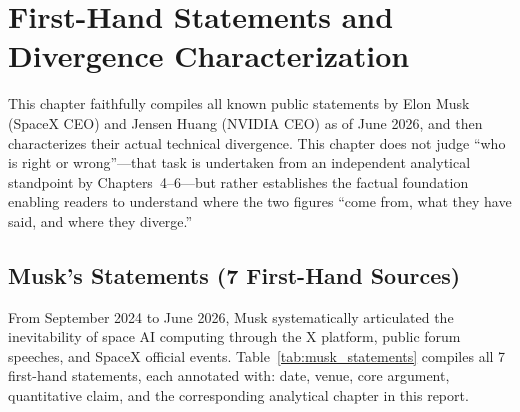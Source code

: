 
\section{First-Hand Statements and Divergence Characterization}

This chapter faithfully compiles all known public statements by Elon Musk (SpaceX CEO) and Jensen Huang (NVIDIA CEO) as of June 2026, and then characterizes their actual technical divergence. This chapter does not judge ``who is right or wrong''---that task is undertaken from an independent analytical standpoint by Chapters~4--6---but rather establishes the factual foundation enabling readers to understand where the two figures ``come from, what they have said, and where they diverge.''

\subsection{Musk's Statements (7 First-Hand Sources)}

From September 2024 to June 2026, Musk systematically articulated the inevitability of space AI computing through the X platform, public forum speeches, and SpaceX official events. Table~\ref{tab:musk_statements} compiles all 7 first-hand statements, each annotated with: date, venue, core argument, quantitative claim, and the corresponding analytical chapter in this report.

